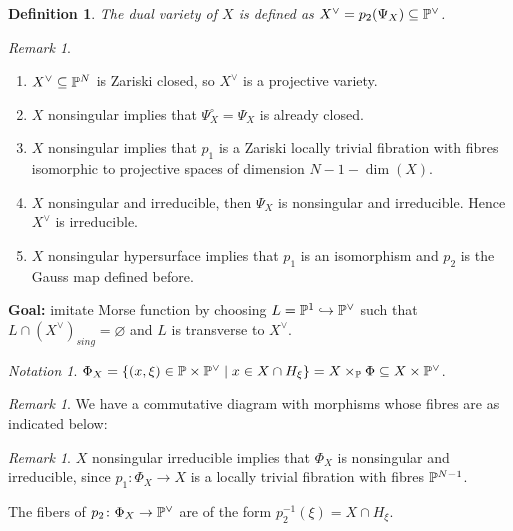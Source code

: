\documentclass[A4paper, british]{amsart}
\theoremstyle{darkgreentheorem}
\theoremstyle{darkbluedefinition}
\newtheorem{defn}[thm]{Definition}
\theoremstyle{darkredexample}
\theoremstyle{remark}
\newtheorem{rem}[thm]{Remark}
\newtheorem{nota}[thm]{Notation}
\newcommand{\1}{\mathbbm{1}}
\newcommand{\dual}{^{\vee}}
\newcommand{\tms}{\times}
\newcommand{\sub}{\subseteq}
\newcommand{\mono}{\hookrightarrow}
\begin{document}
\begin{defn}
    The \textit{dual variety} of $X$ is defined as $X\dual=p_{2}(\Psi_{X})\sub \P\dual$.
\end{defn}

\begin{rem}
    \begin{enumerate}
	\item $X\dual \sub \P^{N}$ is Zariski closed, so $X\dual$ is a projective variety.
	\item $X$ nonsingular implies that $\Psi_{X}^{\circ}=\Psi_{X}$ is already closed.
	\item $X$ nonsingular implies that $p_{1}$ is a Zariski locally trivial fibration with fibres isomorphic to projective spaces of dimension $N-1-\dim(X)$.
	\item $X$ nonsingular and irreducible, then $\Psi_{X}$ is nonsingular and irreducible.
	    Hence $X\dual$ is irreducible.
	\item $X$ nonsingular hypersurface implies that $p_{1}$ is an isomorphism and $p_{2}$ is the Gauss map defined before.
    \end{enumerate}
\end{rem}

\textbf{Goal:} imitate Morse function by choosing $L=\P^{1}\mono \P\dual$ such that $L\cap (X\dual)_{sing}=\varnothing$ and $L$ is transverse to $X\dual$.

\begin{nota}
    $\Phi_{X}=\{(x,\xi)\in \P\tms \P\dual \mid x\in X\cap H_{\xi} \}= X\times_{\P}\Phi\sub X\tms \P\dual$.
\end{nota}

\begin{rem}
    We have a commutative diagram with morphisms whose fibres are as indicated below:
    \begin{center}
    \end{center}
\end{rem}

\begin{rem}
    $X$ nonsingular irreducible implies that $\Phi_{X}$ is nonsingular and irreducible, since $p_{1}\colon \Phi_{X}\to X$ is a locally trivial fibration with fibres $\P^{N-1}$.

    The fibers of $p_{2}\colon \Phi_{X}\to \P\dual$ are of the form $p_{2}^{-1}(\xi)=X\cap H_{\xi}$.
\end{rem}
\end{document}

